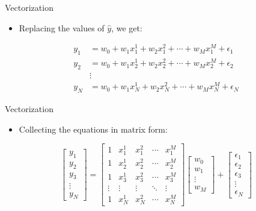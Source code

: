 \begin{frame}{Vectorization}
\begin{itemize}
    \item Replacing the values of $\hat{y}$, we get:
\end{itemize}

\[
\begin{aligned}
    y_1 &= w_0 + w_1 x_1^1 + w_2 x_1^2 + \cdots + w_M x_1^M + \epsilon_1 \\
    y_2 &= w_0 + w_1 x_2^1 + w_2 x_2^2 + \cdots + w_M x_2^M + \epsilon_2 \\
        &\vdots \\
    y_N &= w_0 + w_1 x_N^1 + w_2 x_N^2 + \cdots + w_M x_N^M + \epsilon_N
\end{aligned}
\]
\end{frame}


\begin{frame}{Vectorization}
\begin{itemize}
    \item Collecting the equations in matrix form:
\end{itemize}

\[
\begin{bmatrix}
    y_1 \\
    y_2 \\
    y_3 \\
    \vdots \\
    y_N
\end{bmatrix}
=
\begin{bmatrix}
    1 & x_1^1 & x_1^2 & \cdots & x_1^M \\
    1 & x_2^1 & x_2^2 & \cdots & x_2^M \\
    1 & x_3^1 & x_3^2 & \cdots & x_3^M \\
    \vdots & \vdots & \vdots & \ddots & \vdots \\
    1 & x_N^1 & x_N^2 & \cdots & x_N^M
\end{bmatrix}
\begin{bmatrix}
    w_0 \\
    w_1 \\
    \vdots \\
    w_M
\end{bmatrix}
+
\begin{bmatrix}
    \epsilon_1 \\
    \epsilon_2 \\
    \epsilon_3 \\
    \vdots \\
    \epsilon_N
\end{bmatrix}
\]
\end{frame}


